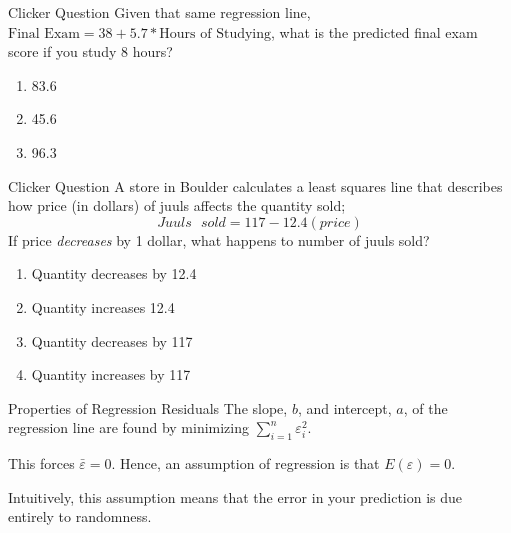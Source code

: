\documentclass{beamer}
\begin{document}
\begin{frame}{Clicker Question}
	Given that same regression line, $\text{Final Exam}=38 + 5.7*\text{Hours of Studying}$, what is the predicted final exam score if you study 8 hours?
	
	\begin{enumerate}[label=(\alph*)]
		\item 83.6
		\item 45.6
		\item 96.3
	\end{enumerate}
\end{frame}

\begin{frame}{Clicker Question}
	A store in Boulder calculates a least squares line that describes how price (in dollars) of juuls affects the quantity sold; $$Juuls\text{ }sold = 117-12.4(price)$$ If price \textit{decreases} by 1 dollar, what happens to number of juuls sold?
	
	\begin{enumerate}[label=(\alph*)]
		\item Quantity decreases by 12.4
		\item Quantity increases 12.4
		\item Quantity decreases by 117
		\item Quantity increases by 117
	\end{enumerate}
\end{frame}

\begin{frame}{Properties of Regression Residuals}
	The slope, $b$, and intercept, $a$, of the regression line are found by minimizing $\sum_{i=1}^n \varepsilon_i^2$.
	\vspace{.25in}
			
	This forces $\bar{\varepsilon}=0$. Hence, an \alert{assumption} of regression is that $E(\varepsilon)=0$.
	\vspace{.25in}
			
	Intuitively, this assumption means that the error in your prediction is due entirely to randomness. 
\end{frame}
\end{document}
